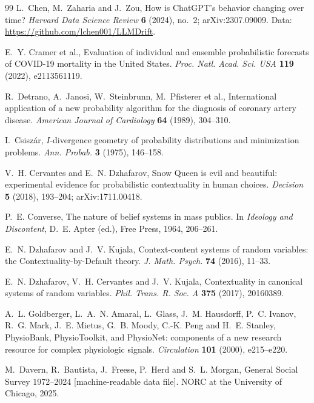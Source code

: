 \documentclass[11pt]{article}
\theoremstyle{definition}
\theoremstyle{remark}
\begin{document}
\begin{thebibliography}{99}
L.~Chen, M.~Zaharia and J.~Zou, How is ChatGPT's behavior changing over time? \emph{Harvard Data Science Review} \textbf{6} (2024), no.~2;
arXiv:2307.09009. Data: \url{https://github.com/lchen001/LLMDrift}.

E.~Y. Cramer et al., Evaluation of individual and ensemble probabilistic forecasts of {COVID}-19 mortality in the {U}nited {S}tates.
\emph{Proc. Natl. Acad. Sci. USA} \textbf{119} (2022), e2113561119.

R.~Detrano, A.~Janosi, W.~Steinbrunn, M.~Pfisterer et al., International application
of a new probability algorithm for the diagnosis of coronary artery disease. \emph{American Journal of Cardiology} \textbf{64} (1989), 304--310.

I.~Csisz\'ar, $I$-divergence geometry of probability distributions and minimization problems. \emph{Ann. Probab.} \textbf{3} (1975), 146--158.

V.~H. Cervantes and E.~N. Dzhafarov, Snow Queen is evil and beautiful: experimental evidence for probabilistic contextuality in human
choices. \emph{Decision} \textbf{5} (2018), 193--204; arXiv:1711.00418.

P.~E. Converse, The nature of belief systems in mass publics. In \emph{Ideology and Discontent}, D.~E. Apter (ed.), Free Press, 1964, 206--261.

E.~N. Dzhafarov and J.~V. Kujala, Context-content systems of random variables: the Contextuality-by-Default theory.
\emph{J. Math. Psych.} \textbf{74} (2016), 11--33.

E.~N. Dzhafarov, V.~H. Cervantes and J.~V. Kujala, Contextuality in canonical systems of random variables. \emph{Phil. Trans. R. Soc. A}
\textbf{375} (2017), 20160389.

A.~L. Goldberger, L.~A.~N. Amaral, L.~Glass, J.~M. Hausdorff, P.~C. Ivanov, R.~G. Mark, J.~E. Mietus, G.~B. Moody, C.-K. Peng and
H.~E. Stanley, PhysioBank, PhysioToolkit, and PhysioNet: components of a new research resource for complex physiologic signals.
\emph{Circulation} \textbf{101} (2000), e215--e220.

M.~Davern, R.~Bautista, J.~Freese, P.~Herd and S.~L. Morgan, General Social Survey 1972--2024 [machine-readable data file]. NORC at the
University of Chicago, 2025.


\end{thebibliography}
\end{document}

